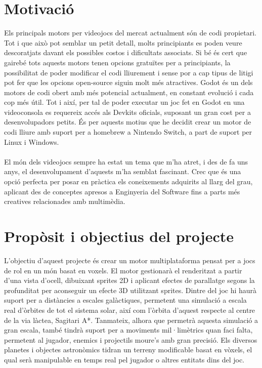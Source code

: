 \section{Motivació}
Els principals motors per videojocs del mercat actualment són de codi propietari. Tot i que això pot semblar un petit detall, molts principiants es poden veure descoratjats davant els possibles costos i dificultats associats.
Si bé és cert que gairebé tots aquests motors tenen opcions gratuïtes per a principiants, la possibilitat de poder modificar el codi lliurement i sense por a cap tipus de litigi pot fer que les opcions open-source siguin molt més atractives.
Godot és un dels motors de codi obert amb més potencial actualment, en constant evolució i cada cop més útil. Tot i així, per tal de poder executar un joc fet en Godot en una videoconsola es requereix accés als Devkits oficials, suposant un gran cost per a desenvolupadors petits.
És per aquests motius que he decidit crear un motor de codi lliure amb suport per a homebrew a Nintendo Switch, a part de suport per Linux i Windows.
\paragraph{}
El món dels videojocs sempre ha estat un tema que m'ha atret, i des de fa uns anys, el desenvolupament d'aquests m'ha semblat fascinant.
Crec que és una opció perfecta per posar en pràctica els coneixements adquirits al llarg del grau, aplicant des de conceptes apresos a Enginyeria del Software fins a parts més creatives relacionades amb multimèdia.
\section{Propòsit i objectius del projecte}
L'objectiu d'aquest projecte és crear un motor multiplataforma pensat per a jocs de rol en un món basat en voxels.
El motor gestionarà el renderitzat a partir d'una vista d'ocell, dibuixant sprites 2D i aplicant efectes de parallatge segons la profunditat per aconseguir un efecte 3D utilitzant sprites.
Dintre del joc hi haurà suport per a distàncies a escales galàctiques, permetent una simulació a escala real d'òrbites de tot el sistema solar, així com l'òrbita d'aquest respecte al centre de la via làctea, Sagitari A*.
Tanmateix, alhora que permetrà aquesta simulació a gran escala, també tindrà suport per a moviments mil·limètrics quan faci falta, permetent al jugador, enemics i projectils moure's amb gran precisió.
Els diversos planetes i objectes astronòmics tidran un terreny modificable basat en vòxels, el qual serà manipulable en temps real pel jugador o altres entitats dins del joc.
